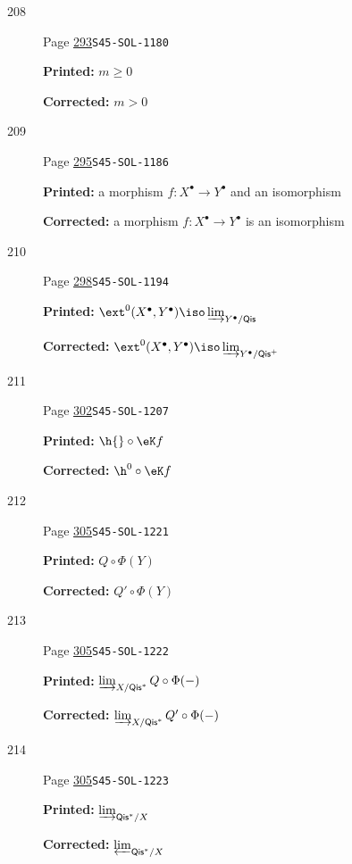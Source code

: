 \begin{description}
\item[\hypertarget{apparatus:EN-0208}{208}] Page \hyperlink{printpage:en:293}{293}\quad\texttt{S45-SOL-1180}
\par\noindent\textbf{Printed:} $m\geqslant 0$
\par\noindent\textbf{Corrected:} $m>0$
\smallskip
\item[\hypertarget{apparatus:EN-0209}{209}] Page \hyperlink{printpage:en:295}{295}\quad\texttt{S45-SOL-1186}
\par\noindent\textbf{Printed:} a morphism $f:X^\bullet \to Y^\bullet$ and
an isomorphism
\par\noindent\textbf{Corrected:} a morphism $f:X^\bullet \to Y^\bullet$ is
an isomorphism
\smallskip
\item[\hypertarget{apparatus:EN-0210}{210}] Page \hyperlink{printpage:en:298}{298}\quad\texttt{S45-SOL-1194}
\par\noindent\textbf{Printed:} \(\ext^0(X^\bullet,Y^\bullet) \iso \varinjlim_{Y^\bullet/\mathsf{Qis}}\)
\par\noindent\textbf{Corrected:} \(\ext^0(X^\bullet,Y^\bullet) \iso \varinjlim_{Y^\bullet/\mathsf{Qis}^+}\)
\smallskip
\item[\hypertarget{apparatus:EN-0211}{211}] Page \hyperlink{printpage:en:302}{302}\quad\texttt{S45-SOL-1207}
\par\noindent\textbf{Printed:} \(\h{}\circ \eK f\)
\par\noindent\textbf{Corrected:} \(\h^0{}\circ \eK f\)
\smallskip
\item[\hypertarget{apparatus:EN-0212}{212}] Page \hyperlink{printpage:en:305}{305}\quad\texttt{S45-SOL-1221}
\par\noindent\textbf{Printed:} $Q\circ \Phi(Y)$
\par\noindent\textbf{Corrected:} $Q'\circ \Phi(Y)$
\smallskip
\item[\hypertarget{apparatus:EN-0213}{213}] Page \hyperlink{printpage:en:305}{305}\quad\texttt{S45-SOL-1222}
\par\noindent\textbf{Printed:} \(\varinjlim_{X/\mathsf{Qis}^\ast} Q\circ\Phi(-)\)
\par\noindent\textbf{Corrected:} \(\varinjlim_{X/\mathsf{Qis}^\ast} Q'\circ\Phi(-)\)
\smallskip
\item[\hypertarget{apparatus:EN-0214}{214}] Page \hyperlink{printpage:en:305}{305}\quad\texttt{S45-SOL-1223}
\par\noindent\textbf{Printed:} \(\varinjlim_{\mathsf{Qis}^\ast/X}\)
\par\noindent\textbf{Corrected:} \(\varprojlim_{\mathsf{Qis}^\ast/X}\)

\end{description}
